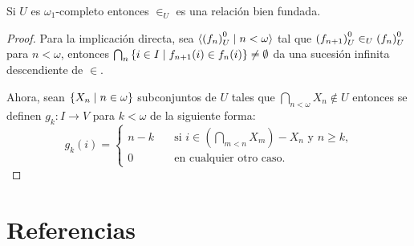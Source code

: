 \begin{teo}
    Si $U$ es $\omega_1$-completo entonces $\in_U$ es una relación bien fundada.
\end{teo}
\begin{proof}
    Para la implicación directa, sea $\langle {(f_n)}_U^0\mid n<\omega \rangle$ tal que
    ${(f_{n+1})}_U^0\in_U{(f_n)}_U^0$ para $n<\omega$,
    entonces $\bigcap_n\left\{ i\in I\mid f_{n+1}(i)\in f_n(i) \right\}\neq\emptyset$
    da una sucesión infinita descendiente de $\in$.

    Ahora, sean $\left\{ X_n\mid n\in\omega \right\}$ subconjuntos de $U$ tales que
    $\bigcap_{n<\omega} X_n\notin U$ entonces se definen $g_k\colon I\to V$
    para $k<\omega$ de la siguiente forma:
    \[
        g_k(i) =
        \begin{cases}
          n-k\quad & \text{si $i\in(\bigcap_{m<n} X_m) - X_n$ y $n\geq k$,}\\
          0\quad & \text{en cualquier otro caso.}
        \end{cases}
    \]
\end{proof}

\fi
\backmatter
\ifreferencias
\chapter*{Referencias}
\printbibliography[heading=mybib]
\fi

